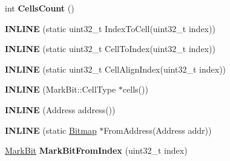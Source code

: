 \begin{DoxyCompactItemize}
\item 
int {\bfseries Cells\+Count} ()\hypertarget{classv8_1_1internal_1_1_bitmap_af6f993e843f40bdb1cc71e3243ee0fc4}{}\label{classv8_1_1internal_1_1_bitmap_af6f993e843f40bdb1cc71e3243ee0fc4}

\item 
{\bfseries I\+N\+L\+I\+NE} (static uint32\+\_\+t Index\+To\+Cell(uint32\+\_\+t index))\hypertarget{classv8_1_1internal_1_1_bitmap_a295790dbd4bcdff9c673eaa170af9dcc}{}\label{classv8_1_1internal_1_1_bitmap_a295790dbd4bcdff9c673eaa170af9dcc}

\item 
{\bfseries I\+N\+L\+I\+NE} (static uint32\+\_\+t Cell\+To\+Index(uint32\+\_\+t index))\hypertarget{classv8_1_1internal_1_1_bitmap_accb0ca9debbb8ff3d1b44805a9c51ea3}{}\label{classv8_1_1internal_1_1_bitmap_accb0ca9debbb8ff3d1b44805a9c51ea3}

\item 
{\bfseries I\+N\+L\+I\+NE} (static uint32\+\_\+t Cell\+Align\+Index(uint32\+\_\+t index))\hypertarget{classv8_1_1internal_1_1_bitmap_a8c1030c7b12f029caf6abf1de575597d}{}\label{classv8_1_1internal_1_1_bitmap_a8c1030c7b12f029caf6abf1de575597d}

\item 
{\bfseries I\+N\+L\+I\+NE} (Mark\+Bit\+::\+Cell\+Type $\ast$cells())\hypertarget{classv8_1_1internal_1_1_bitmap_aefc479b56a25e4f0ce76a952ae691647}{}\label{classv8_1_1internal_1_1_bitmap_aefc479b56a25e4f0ce76a952ae691647}

\item 
{\bfseries I\+N\+L\+I\+NE} (Address address())\hypertarget{classv8_1_1internal_1_1_bitmap_a0f849d35afc1121773e26526422b4c44}{}\label{classv8_1_1internal_1_1_bitmap_a0f849d35afc1121773e26526422b4c44}

\item 
{\bfseries I\+N\+L\+I\+NE} (static \hyperlink{classv8_1_1internal_1_1_bitmap}{Bitmap} $\ast$From\+Address(Address addr))\hypertarget{classv8_1_1internal_1_1_bitmap_a1f558dd2d322cf9760b16a93b2c9a631}{}\label{classv8_1_1internal_1_1_bitmap_a1f558dd2d322cf9760b16a93b2c9a631}

\item 
\hyperlink{classv8_1_1internal_1_1_mark_bit}{Mark\+Bit} {\bfseries Mark\+Bit\+From\+Index} (uint32\+\_\+t index)\hypertarget{classv8_1_1internal_1_1_bitmap_a9a314b5d6a0ae6ca7acd98c42f34145d}{}\label{classv8_1_1internal_1_1_bitmap_a9a314b5d6a0ae6ca7acd98c42f34145d}


\end{DoxyCompactItemize}
